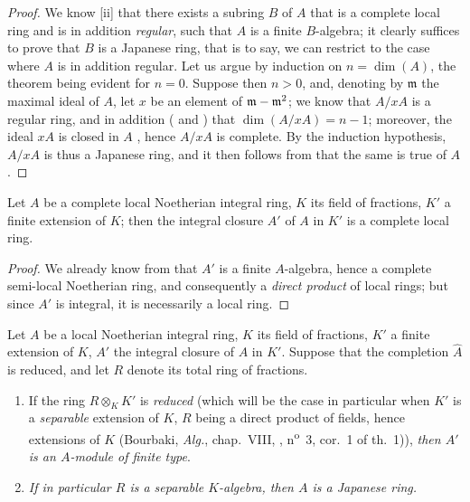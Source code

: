 \begin{proof}
We know [ii] that there exists a subring $B$ of $A$ that is a complete local
ring and is in addition \emph{regular}, such that $A$ is a finite $B$-algebra; it clearly suffices to prove that $B$ is a Japanese ring, that is to say, we can restrict to the case where $A$ is in addition regular.
Let us argue by induction on $n=\dim(A)$, the theorem being evident for $n=0$.
Suppose then $n>0$, and, denoting by $\mathfrak{m}$ the maximal ideal of $A$, let $x$ be an element of $\mathfrak{m}-\mathfrak{m}^2$; we know  that $A/xA$ is a regular ring, and in addition ( and ) that $\dim(A/xA)=n-1$; moreover, the ideal $xA$ is closed in $A$ , hence $A/xA$ is complete.
By the induction hypothesis, $A/xA$ is thus a Japanese ring, and it then follows from  that the same is true of $A$.
\end{proof}

\begin{corollary}[23.1.6]
\label{0.23.1.6}
Let $A$ be a complete local Noetherian integral ring, $K$ its field of fractions, $K'$ a finite extension of $K$; then the integral closure $A'$ of $A$ in $K'$ is a complete local ring.
\end{corollary}

\begin{proof}
We already know from  that $A'$ is a finite $A$-algebra, hence a complete semi-local Noetherian ring, and consequently a \emph{direct product} of local rings; but since $A'$ is integral, it is necessarily a local ring.
\end{proof}

\begin{proposition}[23.1.7]
\label{0.23.1.7}
Let $A$ be a local Noetherian integral ring, $K$ its field of fractions, $K'$ a finite extension of $K$, $A'$ the integral closure of $A$ in $K'$.
Suppose that the completion $\hat{A}$ is reduced, and let $R$ denote its total ring of fractions.
\begin{enumerate}
  \item[{\rm(i)}] If the ring $R\otimes_K K'$ is \emph{reduced} (which will be the case in particular when $K'$ is a \emph{separable} extension of $K$, $R$ being a direct product of fields, hence extensions of $K$ \textnormal{(Bourbaki, \emph{Alg.}, chap.~VIII, , n\textsuperscript{o}~3, cor.~1 of th.~1)}), \emph{then $A'$ is an $A$-module of finite type}.
  \item[{\rm(ii)}] \emph{If in particular $R$ is a separable $K$-algebra, then $A$ is a Japanese ring.}
\end{enumerate}
\end{proposition}

